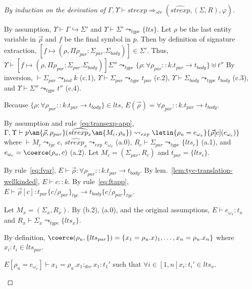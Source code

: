 \begin{proof}[By induction on the derivation of $\Gamma,\Upsilon\vdash
  strexp \Rightarrow_{str} (\widehat{strexp}, (\Sigma,R),\varphi)$]
\begin{description}
\begin{description}
By assumption, $\Upsilon\vdash\Gamma\hookrightarrow \Sigma'$ 
and $\Upsilon\vdash\Sigma'\leadsto_{type} \{ lts \}$. Let $\rho$ be
the last entity variable in $\vec{\rho}$ and $f$ be the final symbol
in $p$. Then by definition of signature extraction, 
$[f\mapsto(\rho, \Pi \rho_{par}:\Sigma_{par}.\Sigma_{body})] \in
\Sigma'$. Thus, $\Upsilon\vdash [f\mapsto(\rho, \Pi
\rho_{par}:\Sigma_{par}.\Sigma_{body})]\Sigma'' \leadsto_{type} 
\{ \rho : \forall\rho_{par} :: k.t_{par} \to t_{body}\} \uplus t''$ By
inversion, $\vdash \Sigma_{par} \leadsto_{knd} k$ (c.1), $\Upsilon\vdash
\Sigma_{par} \leadsto_{type} t_{par}$ (c.2), $\Upsilon\vdash
\Sigma_{body} \leadsto_{type} t_{body}$ (c.3), and $\Upsilon\vdash
\Sigma'' \leadsto_{type} t''$ (c.4).  
 
Because $\{ \rho : \forall\rho_{par} ::k.t_{par} \to t_{body}\} \in
lts$, $E(\vec{\rho}) = \forall\rho_{par} ::k.t_{par} \to t_{body}$. 

  By assumption and rule~\ref{eq:transexp-app},
  $\Gamma,\Upsilon\vdash p\an{\vec{\rho},\rho_{par}}
(\widehat{strexp_x}\an{M_c,\rho_u}) \leadsto_{exp}
  \letin{\rho_u=e_{\omega_x}}{\vec{\rho}[c](e_{\omega_c})}$ 
where $\vdash M_c \leadsto_{tyc} c$,
  $\widehat{strexp_x} \leadsto_{exp} e_{\omega_x}$ (a.0),
  $R_c\vdash \Sigma_{par}\leadsto_{type} \{lts_c\}$ (a.1),
  and $e_{\omega_c}=\coerce(\rho_u,c)$ (a.2). 
  Let $M_c = (\Sigma_{par}, R_c)$ and $t_{par} = \{lts_c\}$.

By rule~\ref{eq:fvar}, $E\vdash \vec{\rho} : \forall\rho_{par} ::
k.t_{par} \to t_{body}$. By lem.~\ref{lem:tyc-translation-wellkinded},
$E \vdash c :: k$. By rule~\ref{eq:ftapp}, $E\vdash \vec{\rho}[c] :
t_{par}\{c/\rho_{par}\}_{tyc} \to t_{body}\{c/\rho_{par}\}_{tyc}$. 

Let $M_x = (\Sigma_x, R_x)$. 
By (b.2), (a.0), and the original assumptions, $E\vdash e_{\omega_x} :
t_x$ and $R_x \vdash \Sigma_x \leadsto_{type} \{ lts_x \}$. 

By definition, $\coerce(\rho_u, \{ lts_{par} \}) =
\{x_1=\rho_u.x)_1,\ldots, x_n=\rho_u.x_n\}$ where $x_i:t_i\in
lts_{par}$. 

$E[\rho_u=e_{\omega_x}]\vdash x_1=\rho_u.x_1 :_{dec} x_1:t_1'$ such
that $\forall i\in[1,n] x_i:t_i'\in lts_x$. 


\end{description}
\end{description}
\end{proof}
